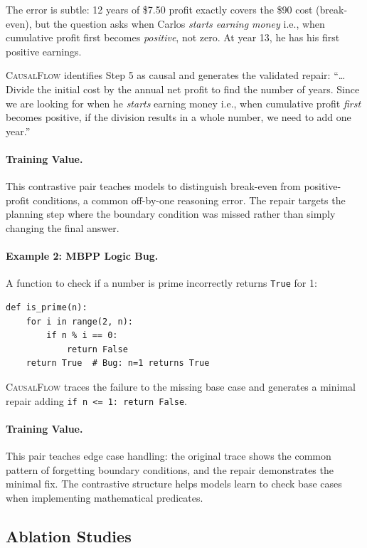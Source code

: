 \documentclass{article}
\theoremstyle{plain}
\theoremstyle{definition}
\theoremstyle{remark}
\begin{document}
The error is subtle: 12 years of \$7.50 profit exactly covers the \$90 cost (break-even), but the question asks when Carlos \emph{starts earning money} i.e., when cumulative profit first becomes \emph{positive}, not zero. At year 13, he has his first positive earnings.

\textsc{CausalFlow} identifies Step 5 as causal and generates the validated repair: ``\ldots Divide the initial cost by the annual net profit to find the number of years. Since we are looking for when he \emph{starts} earning money i.e., when cumulative profit \emph{first} becomes positive, if the division results in a whole number, we need to add one year.''

\paragraph{Training Value.} This contrastive pair teaches models to distinguish break-even from positive-profit conditions, a common off-by-one reasoning error. The repair targets the planning step where the boundary condition was missed rather than simply changing the final answer.

\paragraph{Example 2: MBPP Logic Bug.}
A function to check if a number is prime incorrectly returns \texttt{True} for 1:
\begin{verbatim}
def is_prime(n):
    for i in range(2, n):
        if n % i == 0:
            return False
    return True  # Bug: n=1 returns True
\end{verbatim}

\textsc{CausalFlow} traces the failure to the missing base case and generates a minimal repair adding \texttt{if n <= 1: return False}.

\paragraph{Training Value.} This pair teaches edge case handling: the original trace shows the common pattern of forgetting boundary conditions, and the repair demonstrates the minimal fix. The contrastive structure helps models learn to check base cases when implementing mathematical predicates.

\subsection{Ablation Studies}
\end{document}
